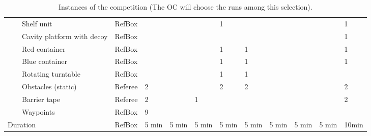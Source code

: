 \begin{landscape}
\begin{table}[h!]
\begin{tabular}{|l|l|l|l*{9}{|P{1cm}}|}
      &  & Shelf unit          & RefBox &       &       &       &   1   &       &       &       &   & 1   \\ \hhline{~~-----------}
&  & Cavity platform with decoy& RefBox &       &       &       &       &       &  \Y   &       &   & 1   \\ \hhline{~~-----------}
      &  & Red container       & RefBox &       &       &       &   1   &   1   &       &       &   & 1   \\ \hhline{~~-----------}
      &  & Blue container      & RefBox &       &       &       &   1   &   1   &       &       &   & 1   \\ \hhline{~~-----------}
      &  & Rotating turntable  & RefBox &       &       &       &   1   &   1   &       &       &   &    \\ 
    \hhline{-------------} \hhline{-------------}
     & 
     &     Obstacles (static) & Referee &  2    &       &       &   2   &   2   &       &       &   & 2   \\ \hhline{~~-----------}
     &   & Barrier tape       & Referee &  2    &       &   1   &       &       &       &       &   & 2   \\ \hhline{~~-----------}
     &   & Waypoints          & RefBox  &  9    &       &       &       &       &       &       &   &    \\ 
		\hline \hline
		 \multicolumn{3}{|l|}{Duration} 
		                    & RefBox & 5 min   & 5 min & 5 min  & 5 min & 5 min & 5 min & 5 min & 5 min & 10min \\
		\hline
 \end{tabular}
 \caption{Instances of the \RCAW \YEAR competition (The OC will choose the runs among this selection).}
 \label{tab:Instances}
\end{table}
\end{landscape}


